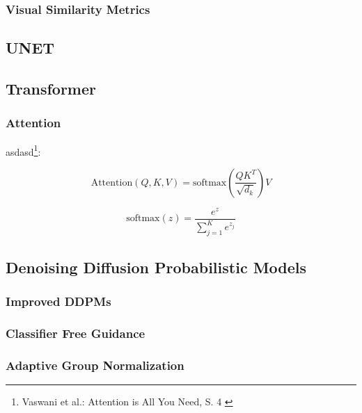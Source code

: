 \subsubsection{Visual Similarity Metrics}




\subsection{UNET}

\subsection{Transformer}


\subsubsection{Attention}

asdasd\footnote{
    Vaswani et al.: Attention is All You Need, S. 4
    \cite{vaswani2023attentionneed}
}:

\begin{equation}
    \text{Attention}(Q, K, V) = \text{softmax}
    \left (
        \frac {QK^T} {\sqrt{d_k}}
    \right ) V
\end{equation}

\begin{equation}
    \text{softmax}(z) = \frac{e^z}{\sum_{j=1}^K e^{z_j}}
\end{equation}

\subsection{Denoising Diffusion Probabilistic Models}

\subsubsection{Improved DDPMs}

\subsubsection{Classifier Free Guidance}

\subsubsection{Adaptive Group Normalization}

